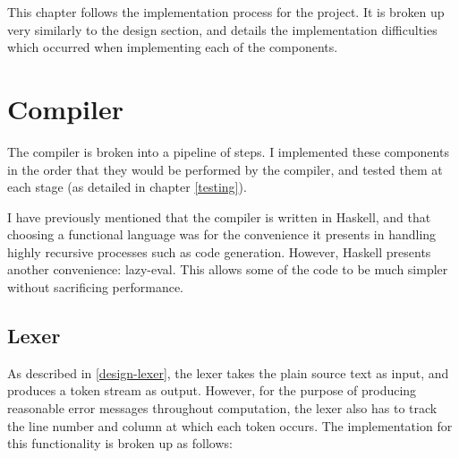 This chapter follows the implementation process for the project. It is broken up
very similarly to the design section, and details the implementation
difficulties which occurred when implementing each of the components.

\section{Compiler}

The compiler is broken into a pipeline of steps. I implemented these components
in the order that they would be performed by the compiler, and tested them at
each stage (as detailed in chapter \ref{testing}).

I have previously mentioned that the compiler is written in Haskell, and that
choosing a functional language was for the convenience it presents in handling
highly recursive processes such as code generation. However, Haskell presents
another convenience: \gls{lazy-eval}. This allows some of the code to be much
simpler without sacrificing performance.

\subsection{Lexer}

As described in \ref{design-lexer}, the lexer takes the plain source text as
input, and produces a token stream as output. However, for the purpose of
producing reasonable error messages throughout computation, the lexer also has
to track the line number and column at which each token occurs. The
implementation for this functionality is broken up as follows:

